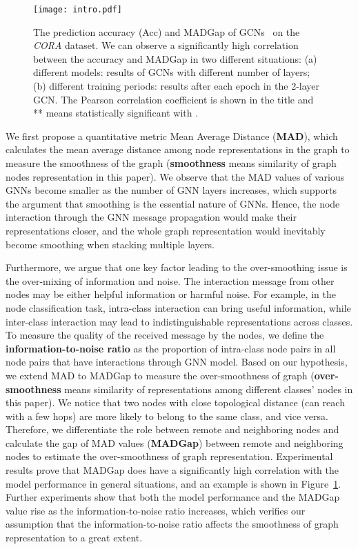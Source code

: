 \documentclass[letterpaper]{article} \usepackage{aaai20}  \usepackage{times}  \usepackage{helvet} \usepackage{courier}  \usepackage[hyphens]{url}  \usepackage{graphicx} \urlstyle{rm} \def\UrlFont{\rm}  \frenchspacing  \setlength{\pdfpagewidth}{8.5in}  \setlength{\pdfpageheight}{11in}  \setcounter{secnumdepth}{0}
\newcommand{\citep}{\cite}
\begin{document}
\begin{figure}[t!]
\centering
\texttt{[image: intro.pdf]}
\caption{The prediction accuracy (Acc) and MADGap of GCNs~\citep{model_gcn} on the \textit{CORA} dataset. We can observe a significantly high correlation between the accuracy and MADGap in two different situations: (a) different models: results of GCNs with different number of layers; (b) different training periods: results after each epoch in the 2-layer GCN. The Pearson correlation coefficient is shown in the title and ** means statistically significant with .}
\label{figure_introduction}
\end{figure}

We first propose a quantitative metric Mean Average Distance (\textbf{MAD}), which calculates the mean average distance among node representations in the graph to measure the smoothness of the graph (\textbf{smoothness} means similarity of graph nodes representation in this paper). 
We observe that the MAD values of various GNNs become smaller as the number of GNN layers  increases, which supports the argument that smoothing is the essential nature of GNNs. Hence, the node interaction through the GNN message propagation would make their representations closer, and the whole graph representation would inevitably become smoothing when stacking multiple layers.

Furthermore, we argue that one key factor leading to the over-smoothing issue is the over-mixing of information and noise. 
The interaction message from other nodes may be either helpful information or harmful noise.
For example, in the node classification task, intra-class interaction can bring useful information, while inter-class interaction may lead to indistinguishable representations across classes. 
To measure the quality of the received message by the nodes, we define the \textbf{information-to-noise ratio} as the proportion of intra-class node pairs in all node pairs that have interactions through GNN model.
Based on our hypothesis, we extend MAD to MADGap to measure the over-smoothness of graph (\textbf{over-smoothness} means similarity of representations among different classes' nodes in this paper). We notice that two nodes with close topological distance (can reach with a few hops) are more likely to belong to the same class, and vice versa. 
Therefore, we differentiate the role between remote and neighboring nodes and calculate the gap of MAD values (\textbf{MADGap}) between remote and neighboring nodes to estimate the over-smoothness of graph representation.
Experimental results prove that MADGap does have a significantly high correlation with the model performance in general situations, and an example is shown in Figure~\ref{figure_introduction}. 
Further experiments show that both the model performance and the MADGap value rise as the information-to-noise ratio increases, which verifies our assumption that the information-to-noise ratio affects the smoothness of graph representation to a great extent.
\end{document}
